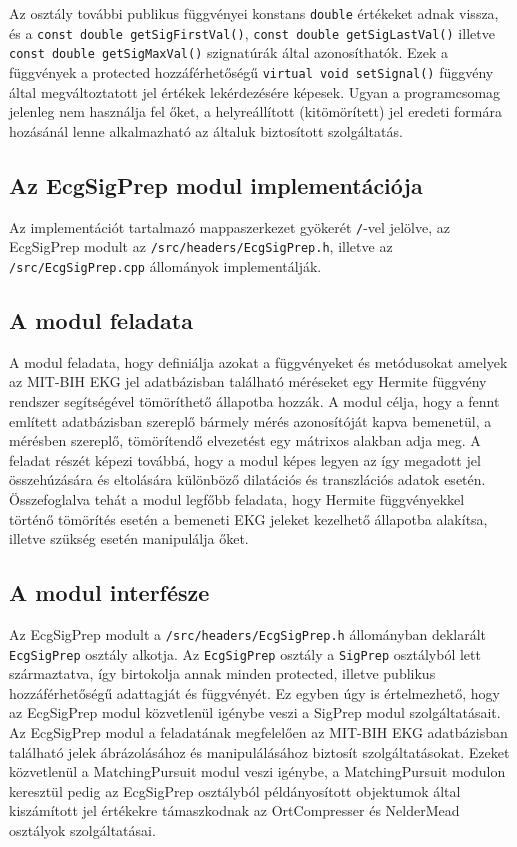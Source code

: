 \documentclass[oneside,titlepage,12pt,a4paper]{report}
\begin{document}
\par Az osztály további publikus függvényei konstans \texttt{double} értékeket adnak vissza, és a \texttt{const double getSigFirstVal()}, \texttt{const double getSigLastVal()} illetve \texttt{const double getSigMaxVal()} szignatúrák által azonosíthatók. Ezek a függvények a protected hozzáférhetőségű \texttt{virtual void setSignal()} függvény által megváltoztatott jel értékek lekérdezésére képesek. Ugyan a programcsomag jelenleg nem használja fel őket, a helyreállított (kitömörített) jel eredeti formára hozásánál lenne alkalmazható az általuk biztosított szolgáltatás.   


\subsection{Az EcgSigPrep modul implementációja}

Az implementációt tartalmazó mappaszerkezet gyökerét \texttt{/}-vel jelölve, az EcgSigPrep modult  az \texttt{/src/headers/EcgSigPrep.h}, illetve az \texttt{/src/EcgSigPrep.cpp} állományok implementálják. 

\subsection*{A modul feladata}

\par A modul feladata, hogy definiálja azokat a függvényeket és metódusokat amelyek az MIT-BIH EKG jel adatbázisban található méréseket egy Hermite függvény rendszer segítségével tömöríthető állapotba hozzák. A modul célja, hogy a fennt említett adatbázisban szereplő bármely mérés azonosítóját kapva bemenetül, a mérésben szereplő, tömörítendő elvezetést egy mátrixos alakban adja meg. A feladat részét képezi továbbá, hogy a modul képes legyen az így megadott jel összehúzására és eltolására különböző dilatációs és transzlációs adatok esetén. Összefoglalva tehát a modul legfőbb feladata, hogy Hermite függvényekkel történő tömörítés esetén a bemeneti EKG jeleket kezelhető állapotba alakítsa, illetve szükség esetén manipulálja őket.  

\subsection*{A modul interfésze}

\par Az EcgSigPrep modult a \texttt{/src/headers/EcgSigPrep.h} állományban deklarált \texttt{EcgSigPrep} osztály alkotja. Az \texttt{EcgSigPrep} osztály a \texttt{SigPrep} osztályból lett származtatva, így birtokolja annak minden protected, illetve publikus hozzáférhetőségű adattagját és függvényét. Ez egyben úgy is értelmezhető, hogy az EcgSigPrep modul közvetlenül igénybe veszi a SigPrep modul szolgáltatásait. Az EcgSigPrep modul a feladatának megfelelően az MIT-BIH EKG adatbázisban található jelek ábrázolásához és manipulálásához biztosít szolgáltatásokat. Ezeket közvetlenül a MatchingPursuit modul veszi igénybe, a MatchingPursuit modulon keresztül pedig az EcgSigPrep osztályból példányosított objektumok által kiszámított jel értékekre támaszkodnak az OrtCompresser és NelderMead osztályok szolgáltatásai. 
\end{document}
